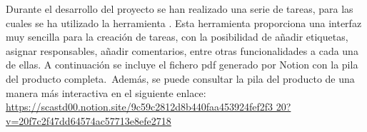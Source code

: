 
Durante el desarrollo del proyecto se han realizado una serie de tareas, para las cuales se ha utilizado la
herramienta .
Esta herramienta proporciona una interfaz muy sencilla para la creación de tareas, con la
posibilidad de añadir etiquetas, asignar responsables, añadir comentarios, entre otras funcionalidades a cada una de
ellas.
A continuación se incluye el fichero pdf generado por Notion con la pila del producto completa.\ Además, se puede
consultar la pila del producto de una manera más interactiva en el siguiente enlace:
\href{https://scastd00.notion.site/9c59c2812d8b440faa453924fef2f320?v=20f7c2f47dd64574ac57713e8efe2718}
{https://scastd00.notion.site/9c59c2812d8b440faa453924fef2f3
20?v=20f7c2f47dd64574ac57713e8efe2718}

\label{anx:product-backlog-notion}

